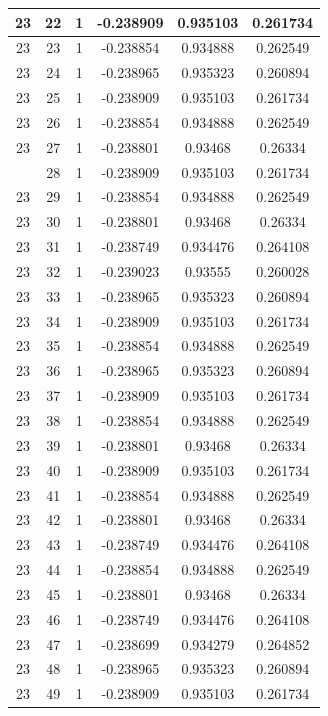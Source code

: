 \documentclass[12pt,a4paper]{article}
\numberwithin{equation}{section}
\numberwithin{figure}{section}
\numberwithin{table}{section}
\begin{document}
\begin{longtable}{|c|c|c|c|c|c|}
23 & 22 & 1 & -0.238909 & 0.935103 & 0.261734 \\ \hline
23 & 23 & 1 & -0.238854 & 0.934888 & 0.262549 \\ \hline
23 & 24 & 1 & -0.238965 & 0.935323 & 0.260894 \\ \hline
23 & 25 & 1 & -0.238909 & 0.935103 & 0.261734 \\ \hline
23 & 26 & 1 & -0.238854 & 0.934888 & 0.262549 \\ \hline
23 & 27 & 1 & -0.238801 & 0.93468 & 0.26334 \\ \hline
\pagebreak
23 & 28 & 1 & -0.238909 & 0.935103 & 0.261734 \\ \hline
23 & 29 & 1 & -0.238854 & 0.934888 & 0.262549 \\ \hline
23 & 30 & 1 & -0.238801 & 0.93468 & 0.26334 \\ \hline
23 & 31 & 1 & -0.238749 & 0.934476 & 0.264108 \\ \hline
23 & 32 & 1 & -0.239023 & 0.93555 & 0.260028 \\ \hline
23 & 33 & 1 & -0.238965 & 0.935323 & 0.260894 \\ \hline
23 & 34 & 1 & -0.238909 & 0.935103 & 0.261734 \\ \hline
23 & 35 & 1 & -0.238854 & 0.934888 & 0.262549 \\ \hline
23 & 36 & 1 & -0.238965 & 0.935323 & 0.260894 \\ \hline
23 & 37 & 1 & -0.238909 & 0.935103 & 0.261734 \\ \hline
23 & 38 & 1 & -0.238854 & 0.934888 & 0.262549 \\ \hline
23 & 39 & 1 & -0.238801 & 0.93468 & 0.26334 \\ \hline
23 & 40 & 1 & -0.238909 & 0.935103 & 0.261734 \\ \hline
23 & 41 & 1 & -0.238854 & 0.934888 & 0.262549 \\ \hline
23 & 42 & 1 & -0.238801 & 0.93468 & 0.26334 \\ \hline
23 & 43 & 1 & -0.238749 & 0.934476 & 0.264108 \\ \hline
23 & 44 & 1 & -0.238854 & 0.934888 & 0.262549 \\ \hline
23 & 45 & 1 & -0.238801 & 0.93468 & 0.26334 \\ \hline
23 & 46 & 1 & -0.238749 & 0.934476 & 0.264108 \\ \hline
23 & 47 & 1 & -0.238699 & 0.934279 & 0.264852 \\ \hline
23 & 48 & 1 & -0.238965 & 0.935323 & 0.260894 \\ \hline
23 & 49 & 1 & -0.238909 & 0.935103 & 0.261734 \\ \hline

\end{longtable}
\end{document}
